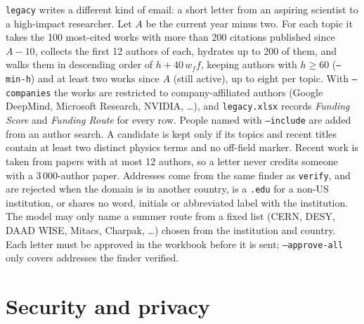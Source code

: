 \documentclass[11pt,a4paper]{article}
\newcommand{\code}[1]{\texttt{#1}}
\begin{document}
\code{legacy} writes a different kind of email: a short letter from an aspiring scientist to a
high-impact researcher. Let $A$ be the current year minus two. For each topic it takes the 100
most-cited works with more than 200 citations published since $A - 10$, collects the first 12
authors of each, hydrates up to 200 of them, and walks them in descending order of
$h + 40\,w_f f$, keeping
authors with $h \ge 60$ (\code{--min-h}) and at least two works since $A$ (still active), up to
eight per topic. With \code{--companies} the works are restricted to company-affiliated authors
(Google DeepMind, Microsoft Research, NVIDIA, \ldots), and \code{legacy.xlsx} records
\emph{Funding Score} and \emph{Funding Route} for every row. People named with \code{--include} are added from an author search. A
candidate is kept only if its topics and recent titles contain at least two distinct physics
terms and no off-field marker. Recent work is taken from papers with at most 12 authors, so a
letter never credits someone with a 3\,000-author paper. Addresses come from the same finder as
\code{verify}, and are rejected when the domain is in another country, is a \code{.edu} for a
non-US institution, or shares no word, initials or abbreviated label with the institution. The
model may only name a summer route from a fixed list (CERN, DESY, DAAD WISE, Mitacs, Charpak,
\ldots) chosen from the institution and country. Each letter must be approved in the workbook
before it is sent; \code{--approve-all} only covers addresses the finder verified.

\section{Security and privacy}
\end{document}
